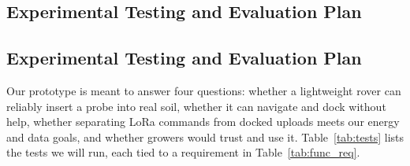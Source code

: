 \documentclass[12pt, letterpaper]{article}
\begin{document}
\subsection{Experimental Testing and Evaluation Plan}
\subsection{Experimental Testing and Evaluation Plan}
Our prototype is meant to answer four questions: whether a lightweight rover can reliably insert a probe into real soil, whether it can navigate and dock without help, whether separating LoRa commands from docked uploads meets our energy and data goals, and whether growers would trust and use it. Table~\ref{tab:tests} lists the tests we will run, each tied to a requirement in Table~\ref{tab:func_req}.
\end{document}
